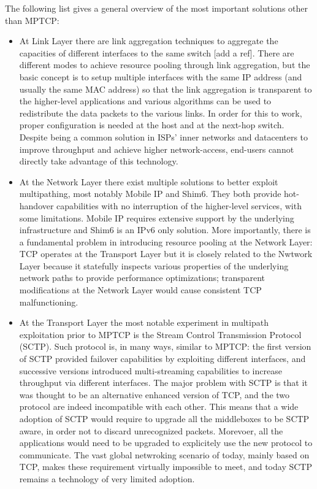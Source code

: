 The following list gives a general overview of the most important solutions other than MPTCP:
\begin{itemize}
  \item At Link Layer there are link aggregation techniques to aggregate the capacities of different interfaces to the same switch [add a ref]. There are different modes to achieve resource pooling through link aggregation, but the basic concept is to setup multiple interfaces with the same IP address (and usually the same MAC address) so that the link aggregation is transparent to the higher-level applications and various algorithms can be used to redistribute the data packets to the various links. In order for this to work, proper configuration is needed at the host and at the next-hop switch. Despite being a common solution in ISPs' inner networks and datacenters to improve throughput and achieve higher network-access, end-users cannot directly take advantage of this technology.


  \item At the Network Layer there exist multiple solutions to better exploit multipathing, most notably Mobile IP and Shim6. They both provide hot-handover capabilities with no interruption of the higher-level services, with some limitations. Mobile IP requires extensive support by the underlying infrastructure and Shim6 is an IPv6 only solution. More importantly, there is a fundamental problem in introducing resource pooling at the Network Layer: TCP operates at the Transport Layer but it is closely related to the Nwtwork Layer because it statefully inspects various properties of the underlying network paths to provide performance optimizations; transparent modifications at the Network Layer would cause consistent TCP malfunctioning.


  \item At the Transport Layer the most notable experiment in multipath exploitation prior to MPTCP is the Stream Control Transmission Protocol (SCTP). Such protocol is, in many ways, similar to MPTCP: the first version of SCTP provided failover capabilities by exploiting different interfaces, and successive versions introduced multi-streaming capabilities to increase throughput via different interfaces. The major problem with SCTP is that it was thought to be an alternative enhanced version of TCP, and the two protocol are indeed incompatible with each other. This means that a wide adoption of SCTP would require to upgrade all the middleboxes to be SCTP aware, in order not to discard unrecognized packets. Morevoer, all the applications would need to be upgraded to explicitely use the new protocol to communicate. The vast global netwroking scenario of today, mainly based on TCP, makes these requirement virtually impossible to meet, and today SCTP remains a technology of very limited adoption.
\end{itemize}




